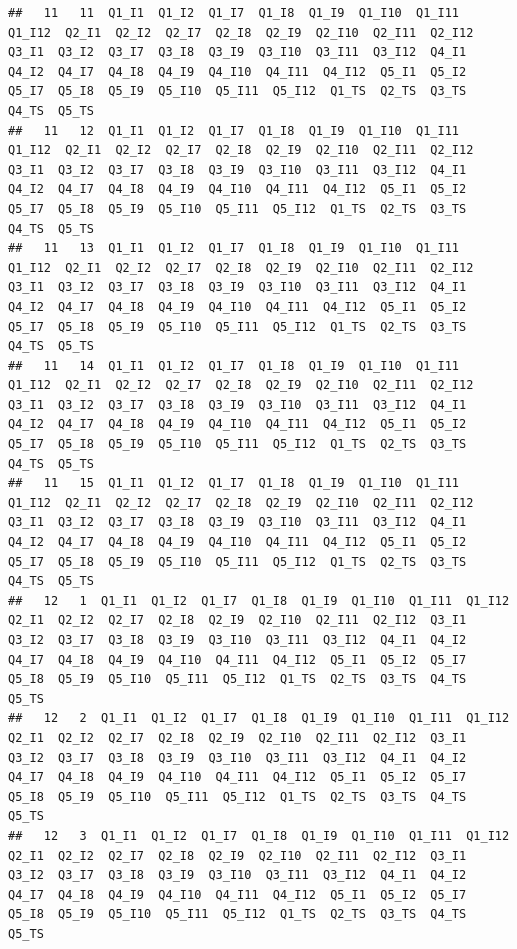 \documentclass[
]{book}
\begin{document}
\begin{verbatim}
##   11   11  Q1_I1  Q1_I2  Q1_I7  Q1_I8  Q1_I9  Q1_I10  Q1_I11  Q1_I12  Q2_I1  Q2_I2  Q2_I7  Q2_I8  Q2_I9  Q2_I10  Q2_I11  Q2_I12  Q3_I1  Q3_I2  Q3_I7  Q3_I8  Q3_I9  Q3_I10  Q3_I11  Q3_I12  Q4_I1  Q4_I2  Q4_I7  Q4_I8  Q4_I9  Q4_I10  Q4_I11  Q4_I12  Q5_I1  Q5_I2  Q5_I7  Q5_I8  Q5_I9  Q5_I10  Q5_I11  Q5_I12  Q1_TS  Q2_TS  Q3_TS  Q4_TS  Q5_TS
##   11   12  Q1_I1  Q1_I2  Q1_I7  Q1_I8  Q1_I9  Q1_I10  Q1_I11  Q1_I12  Q2_I1  Q2_I2  Q2_I7  Q2_I8  Q2_I9  Q2_I10  Q2_I11  Q2_I12  Q3_I1  Q3_I2  Q3_I7  Q3_I8  Q3_I9  Q3_I10  Q3_I11  Q3_I12  Q4_I1  Q4_I2  Q4_I7  Q4_I8  Q4_I9  Q4_I10  Q4_I11  Q4_I12  Q5_I1  Q5_I2  Q5_I7  Q5_I8  Q5_I9  Q5_I10  Q5_I11  Q5_I12  Q1_TS  Q2_TS  Q3_TS  Q4_TS  Q5_TS
##   11   13  Q1_I1  Q1_I2  Q1_I7  Q1_I8  Q1_I9  Q1_I10  Q1_I11  Q1_I12  Q2_I1  Q2_I2  Q2_I7  Q2_I8  Q2_I9  Q2_I10  Q2_I11  Q2_I12  Q3_I1  Q3_I2  Q3_I7  Q3_I8  Q3_I9  Q3_I10  Q3_I11  Q3_I12  Q4_I1  Q4_I2  Q4_I7  Q4_I8  Q4_I9  Q4_I10  Q4_I11  Q4_I12  Q5_I1  Q5_I2  Q5_I7  Q5_I8  Q5_I9  Q5_I10  Q5_I11  Q5_I12  Q1_TS  Q2_TS  Q3_TS  Q4_TS  Q5_TS
##   11   14  Q1_I1  Q1_I2  Q1_I7  Q1_I8  Q1_I9  Q1_I10  Q1_I11  Q1_I12  Q2_I1  Q2_I2  Q2_I7  Q2_I8  Q2_I9  Q2_I10  Q2_I11  Q2_I12  Q3_I1  Q3_I2  Q3_I7  Q3_I8  Q3_I9  Q3_I10  Q3_I11  Q3_I12  Q4_I1  Q4_I2  Q4_I7  Q4_I8  Q4_I9  Q4_I10  Q4_I11  Q4_I12  Q5_I1  Q5_I2  Q5_I7  Q5_I8  Q5_I9  Q5_I10  Q5_I11  Q5_I12  Q1_TS  Q2_TS  Q3_TS  Q4_TS  Q5_TS
##   11   15  Q1_I1  Q1_I2  Q1_I7  Q1_I8  Q1_I9  Q1_I10  Q1_I11  Q1_I12  Q2_I1  Q2_I2  Q2_I7  Q2_I8  Q2_I9  Q2_I10  Q2_I11  Q2_I12  Q3_I1  Q3_I2  Q3_I7  Q3_I8  Q3_I9  Q3_I10  Q3_I11  Q3_I12  Q4_I1  Q4_I2  Q4_I7  Q4_I8  Q4_I9  Q4_I10  Q4_I11  Q4_I12  Q5_I1  Q5_I2  Q5_I7  Q5_I8  Q5_I9  Q5_I10  Q5_I11  Q5_I12  Q1_TS  Q2_TS  Q3_TS  Q4_TS  Q5_TS
##   12   1  Q1_I1  Q1_I2  Q1_I7  Q1_I8  Q1_I9  Q1_I10  Q1_I11  Q1_I12  Q2_I1  Q2_I2  Q2_I7  Q2_I8  Q2_I9  Q2_I10  Q2_I11  Q2_I12  Q3_I1  Q3_I2  Q3_I7  Q3_I8  Q3_I9  Q3_I10  Q3_I11  Q3_I12  Q4_I1  Q4_I2  Q4_I7  Q4_I8  Q4_I9  Q4_I10  Q4_I11  Q4_I12  Q5_I1  Q5_I2  Q5_I7  Q5_I8  Q5_I9  Q5_I10  Q5_I11  Q5_I12  Q1_TS  Q2_TS  Q3_TS  Q4_TS  Q5_TS
##   12   2  Q1_I1  Q1_I2  Q1_I7  Q1_I8  Q1_I9  Q1_I10  Q1_I11  Q1_I12  Q2_I1  Q2_I2  Q2_I7  Q2_I8  Q2_I9  Q2_I10  Q2_I11  Q2_I12  Q3_I1  Q3_I2  Q3_I7  Q3_I8  Q3_I9  Q3_I10  Q3_I11  Q3_I12  Q4_I1  Q4_I2  Q4_I7  Q4_I8  Q4_I9  Q4_I10  Q4_I11  Q4_I12  Q5_I1  Q5_I2  Q5_I7  Q5_I8  Q5_I9  Q5_I10  Q5_I11  Q5_I12  Q1_TS  Q2_TS  Q3_TS  Q4_TS  Q5_TS
##   12   3  Q1_I1  Q1_I2  Q1_I7  Q1_I8  Q1_I9  Q1_I10  Q1_I11  Q1_I12  Q2_I1  Q2_I2  Q2_I7  Q2_I8  Q2_I9  Q2_I10  Q2_I11  Q2_I12  Q3_I1  Q3_I2  Q3_I7  Q3_I8  Q3_I9  Q3_I10  Q3_I11  Q3_I12  Q4_I1  Q4_I2  Q4_I7  Q4_I8  Q4_I9  Q4_I10  Q4_I11  Q4_I12  Q5_I1  Q5_I2  Q5_I7  Q5_I8  Q5_I9  Q5_I10  Q5_I11  Q5_I12  Q1_TS  Q2_TS  Q3_TS  Q4_TS  Q5_TS

\end{verbatim}
\end{document}
